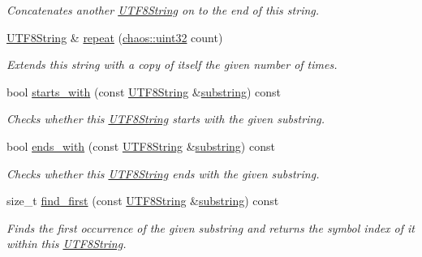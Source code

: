 \begin{DoxyCompactItemize}
\begin{DoxyCompactList}\small\item\em Concatenates another \hyperlink{classchaos_1_1uni_1_1_u_t_f8_string}{U\-T\-F8\-String} on to the end of this string. \end{DoxyCompactList}\item 
\hyperlink{classchaos_1_1uni_1_1_u_t_f8_string}{U\-T\-F8\-String} \& \hyperlink{classchaos_1_1uni_1_1_u_t_f8_string_aae17e9b7d3522e4b504d7d0b5ec22b6e}{repeat} (\hyperlink{namespacechaos_a8641b3ae4551f0b35570d4f9f4ec22d9}{chaos\-::uint32} count)
\begin{DoxyCompactList}\small\item\em Extends this string with a copy of itself the given number of times. \end{DoxyCompactList}\item 
bool \hyperlink{classchaos_1_1uni_1_1_u_t_f8_string_aa4c4a2af7ab4fd921b47a3cb6942ce32}{starts\-\_\-with} (const \hyperlink{classchaos_1_1uni_1_1_u_t_f8_string}{U\-T\-F8\-String} \&\hyperlink{classchaos_1_1uni_1_1_u_t_f8_string_abfc2bac44a9be97d0d27e7b245a7df6e}{substring}) const 
\begin{DoxyCompactList}\small\item\em Checks whether this \hyperlink{classchaos_1_1uni_1_1_u_t_f8_string}{U\-T\-F8\-String} starts with the given substring. \end{DoxyCompactList}\item 
bool \hyperlink{classchaos_1_1uni_1_1_u_t_f8_string_abdf7eeafa6a476ea484d7a2a0e5060e5}{ends\-\_\-with} (const \hyperlink{classchaos_1_1uni_1_1_u_t_f8_string}{U\-T\-F8\-String} \&\hyperlink{classchaos_1_1uni_1_1_u_t_f8_string_abfc2bac44a9be97d0d27e7b245a7df6e}{substring}) const 
\begin{DoxyCompactList}\small\item\em Checks whether this \hyperlink{classchaos_1_1uni_1_1_u_t_f8_string}{U\-T\-F8\-String} ends with the given substring. \end{DoxyCompactList}\item 
size\-\_\-t \hyperlink{classchaos_1_1uni_1_1_u_t_f8_string_ab305c0004c47513225b18bad24b174e9}{find\-\_\-first} (const \hyperlink{classchaos_1_1uni_1_1_u_t_f8_string}{U\-T\-F8\-String} \&\hyperlink{classchaos_1_1uni_1_1_u_t_f8_string_abfc2bac44a9be97d0d27e7b245a7df6e}{substring}) const 
\begin{DoxyCompactList}\small\item\em Finds the first occurrence of the given substring and returns the symbol index of it within this \hyperlink{classchaos_1_1uni_1_1_u_t_f8_string}{U\-T\-F8\-String}. \end{DoxyCompactList}\item 

\end{DoxyCompactItemize}
